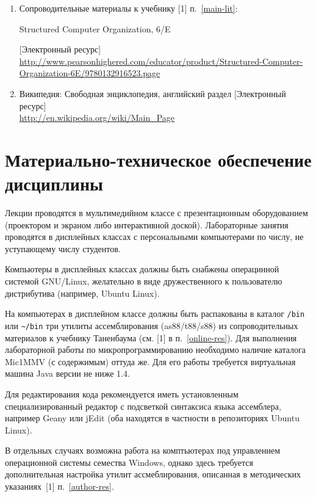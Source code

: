	\label{online-res}
\begin{enumerate}
	\item Сопроводительные материалы к учебнику [1] п.~\ref{main-lit}:
	\begin{otherlanguage}{english}
	Structured Computer Organization, 6/E 
	\end{otherlanguage}
	[Электронный ресурс]\\
	\url{http://www.pearsonhighered.com/educator/product/Structured-Computer-Organization-6E/9780132916523.page}

	\item Википедия: Свободная энциклопедия, английский раздел [Электронный ресурс]\\
	\url{http://en.wikipedia.org/wiki/Main_Page}
\end{enumerate}

\section{Материально-техническое обеспечение дисциплины}
	
Лекции проводятся в мультимедийном классе с презентационным оборудованием (проектором и экраном либо интерактивной доской). Лабораторные занятия проводятся в дисплейных классах с персональными компьютерами по числу, не уступающему числу студентов.


Компьютеры в дисплейных классах должны быть снабжены операцинной системой GNU/Linux, желательно в виде дружественного к пользователю дистрибутива (например, Ubuntu Linux).

На компьютерах в дисплейном классе должны быть распакованы в каталог \texttt{/bin} или \texttt{\textasciitilde/bin} три утилиты ассемблирования (as88/t88/s88) из сопроводительных материалов к учебнику Таненбаума (см. [1] в п.~\ref{online-res}). Для выполнения лабораторной работы по микропрограммированию необходимо наличие каталога Mic1MMV (с содержимым) оттуда же. Для его работы требуется виртуальная машина Java версии не ниже 1.4.

Для редактирования кода рекомендуется иметь установленным специализированный редактор с подсветкой синтаксиса языка ассемблера, например Geany или jEdit (оба находятся в частности в репозиториях Ubuntu Linux).

В отдельных случаях возможна работа на комптьютерах под управлением операционной системы семества Windows, однако здесь требуется дополнительная настройка утилит ассмеблирования, описанная в методических указаниях~[1] п.~\ref{author-res}.


